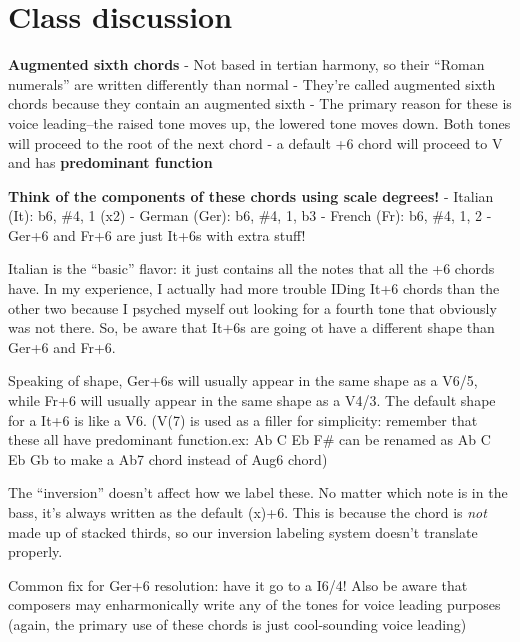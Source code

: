 \documentclass{book}
\begin{document}
\hypertarget{class-discussion-15}{%
\chapter{Class discussion}\label{class-discussion-15}}

\textbf{Augmented sixth chords} - Not based in tertian harmony, so their
``Roman numerals'' are written differently than normal - They're called
augmented sixth chords because they contain an augmented sixth - The primary
reason for these is voice leading--the raised tone moves up, the lowered tone
moves down. Both tones will proceed to the root of the next chord - a default
+6 chord will proceed to V and has \textbf{predominant function}

\textbf{Think of the components of these chords using scale degrees!} -
Italian (It): b6, \#4, 1 (x2) - German (Ger): b6, \#4, 1, b3 - French (Fr):
b6, \#4, 1, 2 - Ger+6 and Fr+6 are just It+6s with extra stuff!

Italian is the ``basic'' flavor: it just contains all the notes that all the
+6 chords have. In my experience, I actually had more trouble IDing It+6
chords than the other two because I psyched myself out looking for a fourth
tone that obviously was not there. So, be aware that It+6s are going ot have a
different shape than Ger+6 and Fr+6.

Speaking of shape, Ger+6s will usually appear in the same shape as a V6/5,
while Fr+6 will usually appear in the same shape as a V4/3. The default shape
for a It+6 is like a V6. (V(7) is used as a filler for simplicity: remember
that these all have predominant function.ex: Ab C Eb F\# can be renamed as Ab
C Eb Gb to make a Ab7 chord instead of Aug6 chord)

The ``inversion'' doesn't affect how we label these. No matter which note is
in the bass, it's always written as the default (x)+6. This is because the
chord is \emph{not} made up of stacked thirds, so our inversion labeling
system doesn't translate properly.

Common fix for Ger+6 resolution: have it go to a I6/4! Also be aware that
composers may enharmonically write any of the tones for voice leading purposes
(again, the primary use of these chords is just cool-sounding voice leading)
\end{document}
